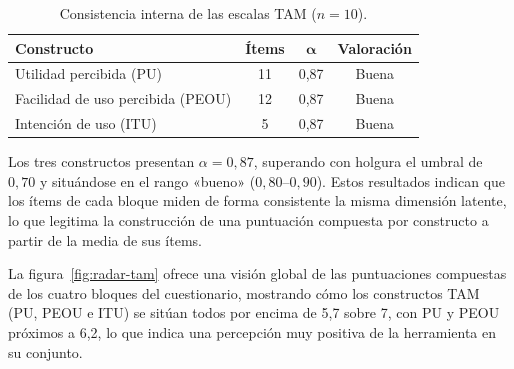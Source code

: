 \begin{table}[h!]
\centering
\caption{Consistencia interna de las escalas TAM ($n = 10$).}
\label{tab:alpha}
\begin{tabular}{@{} l c c c @{}}
\hline
\rule{0pt}{10pt}\textbf{Constructo} & \textbf{Ítems} & $\bm{\alpha}$ & \textbf{Valoración} \\
\hline
\rule{0pt}{10pt}Utilidad percibida (PU)         & 11 & 0{,}87 & Buena \\
Facilidad de uso percibida (PEOU) & 12 & 0{,}87 & Buena \\
Intención de uso (ITU)            &  5 & 0{,}87 & Buena \\
\hline
\end{tabular}
\end{table}

Los tres constructos presentan $\alpha = 0{,}87$, superando con holgura el umbral de $0{,}70$ y situándose en el rango «bueno» ($0{,}80$--$0{,}90$). Estos resultados indican que los ítems de cada bloque miden de forma consistente la misma dimensión latente, lo que legitima la construcción de una puntuación compuesta por constructo a partir de la media de sus ítems.

La figura~\ref{fig:radar-tam} ofrece una visión global de las puntuaciones compuestas de los cuatro bloques del cuestionario, mostrando cómo los constructos TAM (PU, PEOU e ITU) se sitúan todos por encima de 5{,}7 sobre 7, con PU y PEOU próximos a 6{,}2, lo que indica una percepción muy positiva de la herramienta en su conjunto.

